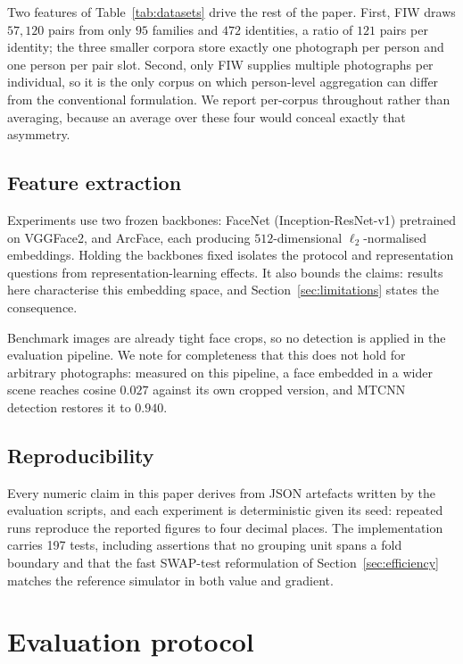 \documentclass[preprint,12pt]{elsarticle}
\begin{document}
Two features of Table~\ref{tab:datasets} drive the rest of the paper. First,
FIW draws $57{,}120$ pairs from only $95$ families and $472$ identities, a
ratio of $121$ pairs per identity; the three smaller corpora store exactly one
photograph per person and one person per pair slot. Second, only FIW supplies
multiple photographs per individual, so it is the only corpus on which
person-level aggregation can differ from the conventional formulation. We
report per-corpus throughout rather than averaging, because an average over
these four would conceal exactly that asymmetry.

\subsection{Feature extraction}

Experiments use two frozen backbones: FaceNet (Inception-ResNet-v1)\cite{schroff2015facenet}
pretrained on VGGFace2, and ArcFace, each producing $512$-dimensional $\ell_2$-normalised
embeddings. Holding the backbones fixed isolates the protocol and
representation questions from representation-learning effects. It also bounds
the claims: results here characterise this embedding space, and
Section~\ref{sec:limitations} states the consequence.

Benchmark images are already tight face crops, so no detection is applied in
the evaluation pipeline. We note for completeness that this does not hold for
arbitrary photographs: measured on this pipeline, a face embedded in a wider
scene reaches cosine $0.027$ against its own cropped version, and MTCNN
detection restores it to $0.940$.

\subsection{Reproducibility}

Every numeric claim in this paper derives from JSON artefacts written by the
evaluation scripts, and each experiment is deterministic given its seed:
repeated runs reproduce the reported figures to four decimal places. The
implementation carries 197 tests, including assertions that no grouping unit
spans a fold boundary and that the fast SWAP-test reformulation of
Section~\ref{sec:efficiency} matches the reference simulator in both value and
gradient.

\section{Evaluation protocol}
\label{sec:protocol}
\end{document}
